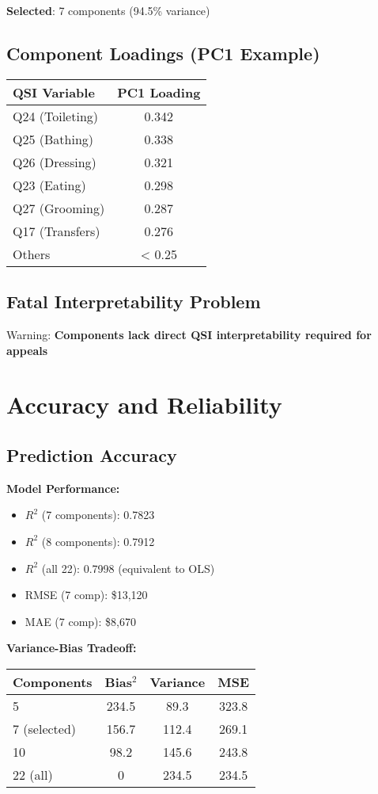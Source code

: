 \textbf{Selected}: 7 components (94.5\% variance)

\subsection{Component Loadings (PC1 Example)}

\begin{center}
\begin{tabular}{lc}
\toprule
QSI Variable & PC1 Loading \\
\midrule
Q24 (Toileting) & 0.342 \\
Q25 (Bathing) & 0.338 \\
Q26 (Dressing) & 0.321 \\
Q23 (Eating) & 0.298 \\
Q27 (Grooming) & 0.287 \\
Q17 (Transfers) & 0.276 \\
Others & < 0.25 \\
\bottomrule
\end{tabular}
\end{center}

\subsection{Fatal Interpretability Problem}

Warning:  \textbf{Components lack direct QSI interpretability required for appeals}

\section{Accuracy and Reliability}

\subsection{Prediction Accuracy}

\textbf{Model Performance:}
\begin{itemize}
    \item $R^2$ (7 components): 0.7823
    \item $R^2$ (8 components): 0.7912
    \item $R^2$ (all 22): 0.7998 (equivalent to OLS)
    \item RMSE (7 comp): \$13,120
    \item MAE (7 comp): \$8,670
\end{itemize}

\textbf{Variance-Bias Tradeoff:}
\begin{center}
\begin{tabular}{lccc}
\toprule
Components & Bias$^2$ & Variance & MSE \\
\midrule
5 & 234.5 & 89.3 & 323.8 \\
7 (selected) & 156.7 & 112.4 & 269.1 \\
10 & 98.2 & 145.6 & 243.8 \\
22 (all) & 0 & 234.5 & 234.5 \\
\bottomrule
\end{tabular}
\end{center}

